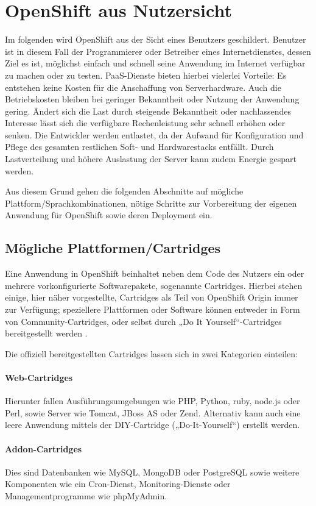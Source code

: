 \documentclass[10pt,a4paper,compsoc]{IEEEtran}
\begin{document}
\section{OpenShift aus Nutzersicht}
\label{sec:user}
Im folgenden wird OpenShift aus der Sicht eines Benutzers geschildert. Benutzer ist in diesem Fall der Programmierer oder Betreiber eines Internetdienstes, dessen Ziel es ist, möglichst einfach und schnell seine Anwendung im Internet verfügbar zu machen oder zu testen. PaaS-Dienste bieten hierbei vielerlei Vorteile:
Es entstehen keine Kosten für die Anschaffung von Serverhardware. Auch die Betriebskosten bleiben bei geringer Bekanntheit oder Nutzung der Anwendung gering.
Ändert sich die Last durch steigende Bekanntheit oder nachlassendes Interesse lässt sich die verfügbare Rechenleistung sehr schnell erhöhen oder senken.
Die Entwickler werden entlastet, da der Aufwand für Konfiguration und Pflege des gesamten restlichen Soft- und Hardwarestacks entfällt.
Durch Lastverteilung und höhere Auslastung der Server kann zudem Energie gespart werden.

Aus diesem Grund gehen die folgenden Abschnitte auf mögliche Plattform/Sprachkombinationen, nötige Schritte zur Vorbereitung der eigenen Anwendung für OpenShift sowie deren Deployment ein. 

\subsection{Mögliche Plattformen/Cartridges}
Eine Anwendung in OpenShift beinhaltet neben dem Code des Nutzers ein oder mehrere vorkonfigurierte Softwarepakete, sogenannte Cartridges. Hierbei stehen einige, hier näher vorgestellte, Cartridges als Teil von OpenShift Origin immer zur Verfügung; speziellere Plattformen oder Software können entweder in Form von Community-Cartridges, oder selbst durch „Do It Yourself“-Cartridges bereitgestellt werden \cite{os_cartridge}.

Die offiziell bereitgestellten Cartridges lassen sich in zwei Kategorien einteilen:

\paragraph*{Web-Cartridges}
Hierunter fallen Ausführungsumgebungen wie PHP, Python, ruby, node.js oder Perl, sowie Server wie Tomcat, JBoss AS oder Zend. Alternativ kann auch eine leere Anwendung mittels der DIY-Cartridge („Do-It-Yourself“) erstellt werden.

\paragraph*{Addon-Cartridges} Dies sind Datenbanken wie MySQL, MongoDB oder PostgreSQL sowie weitere Komponenten wie ein Cron-Dienst, Monitoring-Dienste oder Managementprogramme wie phpMyAdmin.
\end{document}
